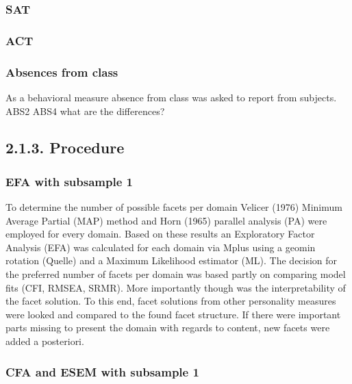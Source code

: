 \documentclass[,man,floatsintext]{apa6}
\theoremstyle{definition}
\theoremstyle{definition}
\theoremstyle{definition}
\theoremstyle{remark}
\begin{document}
\hypertarget{sat}{%
\subsubsection{SAT}\label{sat}}

\hypertarget{act}{%
\subsubsection{ACT}\label{act}}

\hypertarget{absences-from-class}{%
\subsubsection{Absences from class}\label{absences-from-class}}

As a behavioral measure absence from class was asked to report from
subjects. ABS2 ABS4 what are the differences?

\hypertarget{procedure}{%
\subsection{2.1.3. Procedure}\label{procedure}}

\hypertarget{efa-with-subsample-1}{%
\subsubsection{EFA with subsample 1}\label{efa-with-subsample-1}}

To determine the number of possible facets per domain Velicer (1976)
Minimum Average Partial (MAP) method and Horn (1965) parallel analysis
(PA) were employed for every domain. Based on these results an
Exploratory Factor Analysis (EFA) was calculated for each domain via
Mplus using a geomin rotation (Quelle) and a Maximum Likelihood
estimator (ML). The decision for the preferred number of facets per
domain was based partly on comparing model fits (CFI, RMSEA, SRMR). More
importantly though was the interpretability of the facet solution. To
this end, facet solutions from other personality measures were looked
and compared to the found facet structure. If there were important parts
missing to present the domain with regards to content, new facets were
added a posteriori.

\hypertarget{cfa-and-esem-with-subsample-1}{%
\subsubsection{CFA and ESEM with subsample
1}\label{cfa-and-esem-with-subsample-1}}
\end{document}
